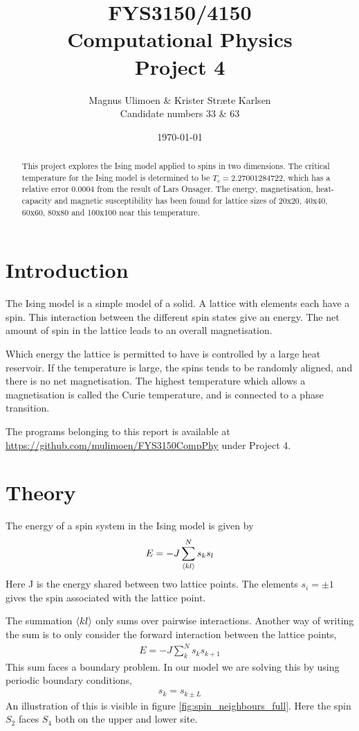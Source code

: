 \documentclass[11pt,a4paper,final]{article}
\title{FYS3150/4150\\Computational Physics\\Project 4}
\author{Magnus Ulimoen \& Krister Stræte Karlsen\\
Candidate numbers 33 \& 63}
\date{\today}
\numberwithin{equation}{section}
\begin{document}
\maketitle

\begin{abstract}
This project explores the Ising model applied to spins in two dimensions.
The critical temperature for the Ising model is determined to be 
$T_c =  2.27001284722$, which has a relative error $0.0004$ from the result 
of Lars Onsager. The energy, magnetisation, heat-capacity and 
magnetic susceptibility has been found for lattice sizes of 20x20, 40x40,
60x60, 80x80 and 100x100 near this temperature.
\end{abstract}



\section{Introduction}

The Ising model is a simple model of a solid. A lattice with elements 
each have a spin. This interaction between the different spin states
give an energy. The net amount of spin in the 
lattice leads to an overall magnetisation. 

Which energy the lattice 
is permitted to have is controlled by a large heat reservoir. If 
the temperature is large, the spins tends to be randomly aligned, 
and there is no net magnetisation. The highest temperature which 
allows a magnetisation is called the Curie temperature, and is 
connected to a phase transition.

The programs belonging to this report is available at 
\url{https://github.com/mulimoen/FYS3150CompPhy} under Project 4.

\section{Theory}

The energy of a spin system in the Ising model is given by
\begin{gather}
E = -J\sum_{\expval{kl}}^N s_k s_l
\end{gather}
Here J is the energy shared between two lattice points. The elements 
$s_i = \pm 1$ gives the spin associated with 
the lattice point.

The summation $\expval{kl}$ only sums over pairwise interactions.
Another way of writing the sum is to only consider the forward 
interaction between the lattice points,
\begin{gather}
E = -J \sum_{k}^N s_k s_{k+1}
\label{eq:Esum}
\end{gather}
This sum faces a boundary problem. In our model we are solving this 
by using periodic boundary conditions,
\begin{gather}
s_k = s_{k \pm L}
\label{eq:boundary}
\end{gather}
An illustration of this is visible in figure \ref{fig:spin_neighbours_full}.
Here the spin $S_2$ faces $S_4$ both on the upper and lower site.
\end{document}
